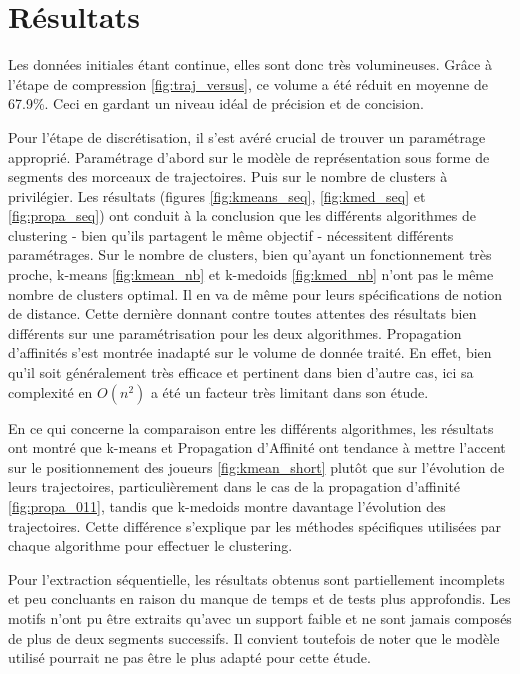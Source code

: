
\section{Résultats}

Les données initiales étant continue, elles sont donc très volumineuses. Grâce à l'étape de compression \ref{fig:traj_versus}, ce volume a été réduit en moyenne de 67.9\%. Ceci en gardant un niveau idéal de précision et de concision.

Pour l'étape de discrétisation, il s'est avéré crucial de trouver un paramétrage approprié. Paramétrage d'abord sur le modèle de représentation sous forme de segments des morceaux de trajectoires. Puis sur le nombre de clusters à privilégier. Les résultats (figures \ref{fig:kmeans_seq}, \ref{fig:kmed_seq} et \ref{fig:propa_seq}) ont conduit à la conclusion que les différents algorithmes de clustering - bien qu'ils partagent le même objectif - nécessitent différents paramétrages. Sur le nombre de clusters, bien qu'ayant un fonctionnement très proche, k-means  \ref{fig:kmean_nb} et k-medoids \ref{fig:kmed_nb} n'ont pas le même nombre de clusters optimal. Il en va de même pour leurs spécifications de notion de distance. Cette dernière donnant contre toutes attentes des résultats bien différents sur une paramétrisation pour les deux algorithmes. 
Propagation d'affinités s'est montrée inadapté sur le volume de donnée traité. En effet, bien qu'il soit généralement très efficace et pertinent dans bien d'autre cas, ici sa complexité en $O(n^2)$ a été un facteur très limitant dans son étude.

En ce qui concerne la comparaison entre les différents algorithmes, les résultats ont montré que k-means et Propagation d'Affinité ont tendance à mettre l'accent sur le positionnement des joueurs \ref{fig:kmean_short} plutôt que sur l'évolution de leurs trajectoires, particulièrement dans le cas de la propagation d'affinité \ref{fig:propa_011}, tandis que k-medoids montre davantage l'évolution des trajectoires. Cette différence s'explique par les méthodes spécifiques utilisées par chaque algorithme pour effectuer le clustering. 

Pour l'extraction séquentielle, les résultats obtenus sont partiellement incomplets et peu concluants en raison du manque de temps et de tests plus approfondis. Les motifs n'ont pu être extraits qu'avec un support faible et ne sont jamais composés de plus de deux segments successifs. Il convient toutefois de noter que le modèle utilisé pourrait ne pas être le plus adapté pour cette étude.



